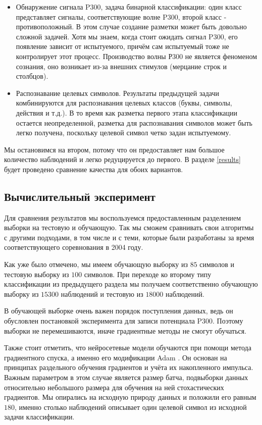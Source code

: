 \documentclass[12pt]{article}
\begin{document}
\begin{itemize}
    \item Обнаружение сигнала P300, задача бинарной классификации: один класс представляет сигналы, соответствующие волне P300, второй класс - противоположный. В этом случае создание разметки может быть довольно сложной задачей. Хотя мы знаем, когда стоит ожидать сигнал P300, его появление зависит от испытуемого, причём сам испытуемый тоже не контролирует этот процесс. Производство волны Р300 не является феноменом сознания, оно возникает из-за внешних стимулов (мерцание строк и столбцов).
    \item Распознавание целевых символов. Результаты предыдущей задачи комбинируются для распознавания целевых классов (буквы, символы, действия и т.д.). В то время как разметка первого этапа классификации остается неопределенной, разметка для распознавания символов может быть легко получена, поскольку целевой символ четко задан испытуемому. 
\end{itemize}

Мы остановимся на втором, потому что он предоставляет нам большое количество наблюдений и легко редуцируется до первого. В разделе \ref{results} будет проведено сравнение качества для обоих вариантов.

\subsection{Вычислительный эксперимент}

Для сравнения результатов мы воспользуемся предоставленным разделением выборки на тестовую и обучающую. Так мы сможем сравнивать свои алгоритмы с другими подходами, в том числе и с теми, которые были разработаны за время соответствующего соревнования в 2004 году.

Как уже было отмечено, мы имеем обучающую выборку из $85$ символов и тестовую выборку из $100$ символов. При переходе ко второму типу классификации из предыдущего раздела мы получаем соответственно обучающую выборку из $15300$ наблюдений и тестовую из $18000$ наблюдений.

В обучающей выборке очень важен порядок поступления данных, ведь он обусловлен постановкой эксперимента для записи потенциала P300. Поэтому выборки не перемешиваются, иначе градиентные методы не смогут обучаться.

Также стоит отметить, что нейросетевые модели обучаются при помощи метода градиентного спуска, а именно его модификации Adam \cite{kingma2014adam}. Он основан на принципах раздельного обучения градиентов и учёта их накопленного импульса. Важным параметром в этом случае является размер батча, подвыборки данных относительно небольшого размера для обучения на ней стохастических градиентов. Мы опирались на исходную природу данных и положили его равным $180$, именно столько наблюдений описывает один целевой символ из исходной задачи классификации.
\end{document}
